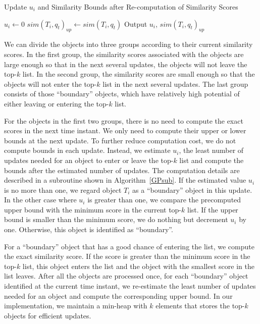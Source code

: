 \begin{algorithm2e}[htb]
 \SetAlgoLined%
 \caption{Update $u_i$ and Similarity Bounds after Re-computation of Similarity Scores}
\label{GPsub}
 
  {$u_i \gets 0$\; $sim(T_i, q_t)_{up} \gets sim(T_i, q_t)$\;}
  Output $u_i$, $sim(T_i, q_t)_{up}$\;
 \end{algorithm2e}
 
We can divide the objects into three groups according to their current similarity scores. In the first group, the similarity scores associated with the objects are large enough so that in the next several updates, the objects will not leave the top-$k$ list. In the second group, the similarity scores are small enough so that the objects will not enter the top-$k$ list in the next several updates. The last group consists of those ``boundary'' objects, which have relatively high potential of either leaving or entering the top-$k$ list. 

For the objects in the first two groups, there is no need to compute the exact scores in the next time instant. We only need to compute their upper or lower bounds at the next update. To further reduce computation cost, we do not compute bounds in each update. Instead, we estimate $u_i$, the least number of updates needed for an object to enter or leave the top-$k$ list and compute the bounds after the estimated number of updates. The computation details are described in a subroutine shown in Algorithm~\ref{GPsub}. If the estimated value $u_i$ is no more than one, we regard object $T_i$ as a ``boundary'' object in this update. In the other case where $u_i$ is greater than one, we compare the precomputed upper bound with the minimum score in the current top-$k$ list. If the upper bound is smaller than the minimum score, we do nothing but decrement $u_i$ by one. Otherwise, this object is identified as ``boundary''.

For a ``boundary'' object that has a good chance of entering the list, we compute the exact similarity score. If the score is greater than the minimum score in the top-$k$ list, this object enters the list and the object with the smallest score in the list leaves. After all the objects are processed once, for each ``boundary'' object identified at the current time instant, we re-estimate the least number of updates needed for an object and compute the corresponding upper bound. 
In our implementation, we maintain a min-heap with $k$ elements that stores the top-$k$ objects for efficient updates.

